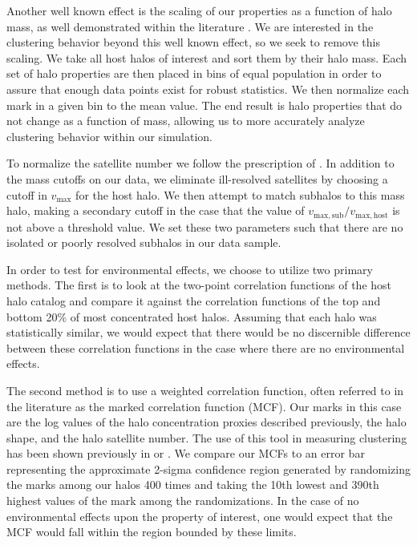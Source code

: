 \documentclass[usenatbib,usegraphicx,letterpaper]{mn2e}
\begin{document}

Another well known effect is the scaling of our properties as a function of halo mass, as well demonstrated within the literature \citep{duffy08}. We are interested in the clustering behavior beyond this well known effect, so we seek to remove this scaling. We take all host halos of interest and sort them by their halo mass. Each set of halo properties are then placed in bins of equal population in order to assure that enough data points exist for robust statistics. We then normalize each mark in a given bin to the mean value. The end result is halo properties that do not change as a function of mass, allowing us to more accurately analyze clustering behavior within our simulation.

To normalize the satellite number we follow the prescription of \citet{wechsler06}. In addition to the mass cutoffs on our data, we eliminate ill-resolved satellites by choosing a cutoff in $v_{\mathrm{max}}$ for the host halo. We then attempt to match subhalos to this mass halo, making a secondary cutoff in the case that the value of $v_{\mathrm{max,sub}} / v_{\mathrm{max,host}}$ is not above a threshold value. We set these two parameters such that there are no isolated or poorly resolved subhalos in our data sample.

In order to test for environmental effects, we choose to utilize two primary methods. The first is to look at the two-point correlation functions of the host halo catalog and compare it against the correlation functions of the top and bottom 20\% of most concentrated host halos. Assuming that each halo was statistically similar, we would expect that there would be no discernible difference between these correlation functions in the case where there are no environmental effects.

The second method is to use a weighted correlation function, often referred to in the literature as the marked correlation function (MCF). Our marks in this case are the log values of the halo concentration proxies described previously, the halo shape, and the halo satellite number. The use of this tool in measuring clustering has been shown previously in \citet{wechsler06} or \citet{harker06}. We compare our MCFs to an error bar representing the approximate 2-sigma confidence region generated by randomizing the marks among our halos 400 times and taking the 10th lowest and 390th highest values of the mark among the randomizations. In the case of no environmental effects upon the property of interest, one would expect that the MCF would fall within the region bounded by these limits.
\end{document}
